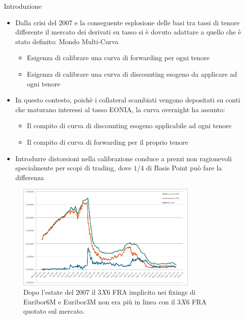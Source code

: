 \titlepageframe %
\begin{tframe}{Introduzione}
\begin{itemize}
\item Dalla crisi del 2007 e la conseguente esplosione delle basi tra tassi di tenore differente il mercato dei derivati su tasso si è dovuto adattare a quello che è stato definito: Mondo Multi-Curva
    \begin{itemize}
    \item Esigenza di calibrare una curva di forwarding per ogni tenore
    \item Esigenza di calibrare una curva di discounting esogeno da applicare ad ogni tenore
    \end{itemize}
\item In questo contesto, poichè i collateral scambiati vengono depositati su conti che maturano interessi al tasso EONIA, la curva overnight ha assunto:
   \begin{itemize}
    \item Il compito di curva di discounting esogeno applicabile ad ogni tenore
    \item Il compito di curva di forwarding per il proprio tenore
    \end{itemize}
\item Introdurre distorsioni nella calibrazione conduce a prezzi non ragionevoli specialmente per scopi di trading, dove $1/4$ di Basis Point può fare la differenza    
\end{itemize}
\end{tframe}
\begin{tframe}
\begin{figure}[!h]
\centering
\includegraphics[width=0.8\textwidth]{basisafter.png}
\caption{Dopo l'estate del 2007 il  $3X6$ FRA implicito nei fixings di Euribor6M e Euribor3M non era più in linea con il $3X6$ FRA quotato sul mercato.}
\label{fig:basisafter}
\end{figure}
\end{tframe}
